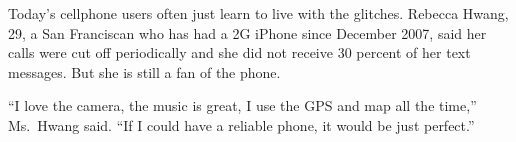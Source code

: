 \documentclass[12pt,a4paper,onecolumn]{article}
\begin{document}
\begin{CJK*}{GBK}{song}
Today's cellphone users often just learn to live with the glitches. Rebecca Hwang, 29, a San
Franciscan who has had a 2G iPhone since December 2007, said her calls were cut off periodically and
she did not receive 30 percent of her text messages. But she is still a fan of the phone.

``I love the camera, the music is great, I use the GPS and map all the time,'' Ms.~Hwang said. ``If
I could have a reliable phone, it would be just perfect.''

\pagebreak
\printindex
\end{CJK*}
\end{document}
